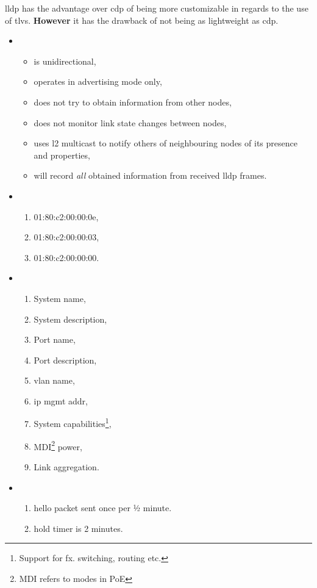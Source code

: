 \gls{lldp} has the advantage over \gls{cdp} of being more customizable in regards to the use of \gls{tlv}s. \textbf{However} it has the drawback of not being as lightweight as \gls{cdp}.

\begin{itemize}
    \item {}
    \begin{itemize}
        \item is unidirectional,
        \item operates in advertising mode only,
        \item does not try to obtain information from other nodes,
        \item does not monitor link state changes between nodes,
        \item uses \gls{l2} multicast to notify others of neighbouring nodes of its presence and properties,
        \item will record \textit{all} obtained information from received \gls{lldp} frames.
    \end{itemize}
    \item {}
    \begin{enumerate}
        \item 01:80:c2:00:00:0e,
        \item 01:80:c2:00:00:03,
        \item 01:80:c2:00:00:00.
    \end{enumerate}
    \item {}
    \begin{enumerate}
        \item System name,
        \item System description,
        \item Port name,
        \item Port description,
        \item \gls{vlan} name,
        \item \gls{ip} mgmt addr,
        \item System capabilities\footnote{Support for fx. switching, routing etc.},
        \item MDI\footnote{MDI refers to modes in PoE} power,
        \item Link aggregation.
    \end{enumerate}
    \item {}
    \begin{enumerate}
        \item hello packet sent once per ½ minute.
        \item hold timer is 2 minutes.
    \end{enumerate}
\end{itemize}

